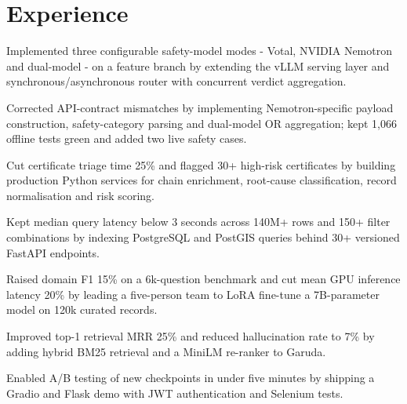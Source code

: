 \vfill
\section{Experience}

\begin{resumeBullets}
  \item Implemented three configurable safety-model modes - Votal, NVIDIA Nemotron and dual-model - on a feature branch by extending the vLLM serving layer and synchronous/asynchronous router with concurrent verdict aggregation.
  \item Corrected API-contract mismatches by implementing Nemotron-specific payload construction, safety-category parsing and dual-model OR aggregation; kept 1,066 offline tests green and added two live safety cases.
\end{resumeBullets}

\begin{resumeBullets}
  \item Cut certificate triage time 25\% and flagged 30+ high-risk certificates by building production Python services for chain enrichment, root-cause classification, record normalisation and risk scoring.
\end{resumeBullets}

\begin{resumeBullets}
  \item Kept median query latency below 3 seconds across 140M+ rows and 150+ filter combinations by indexing \mbox{PostgreSQL} and \mbox{PostGIS} queries behind 30+ versioned FastAPI endpoints.
\end{resumeBullets}

\begin{resumeBullets}
  \item Raised domain F1 15\% on a 6k-question benchmark and cut mean GPU inference latency 20\% by leading a five-person team to LoRA fine-tune a 7B-parameter model on 120k curated records.
  \item Improved top-1 retrieval MRR 25\% and reduced hallucination rate to 7\% by adding hybrid BM25 retrieval and a MiniLM re-ranker to Garuda.
  \item Enabled A/B testing of new checkpoints in under five minutes by shipping a Gradio and Flask demo with JWT authentication and Selenium tests.
\end{resumeBullets}

